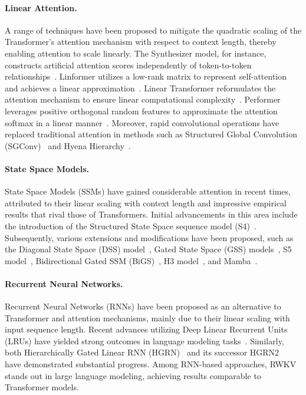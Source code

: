 \paragraph{Linear Attention.} A range of techniques have been proposed to mitigate the quadratic scaling of the Transformer's attention mechanism with respect to context length, thereby enabling attention to scale linearly. The Synthesizer model, for instance, constructs artificial attention scores independently of token-to-token relationships~\citep{Tay:20arxiv}. Linformer utilizes a low-rank matrix to represent self-attention and achieves a linear approximation~\citep{Wang:20arxiv}. Linear Transformer reformulates the attention mechanism to ensure linear computational complexity~\citep{Katharopoulos:20}. Performer leverages positive orthogonal random features to approximate the attention softmax in a linear manner~\citep{Choromanski:21}. Moreover, rapid convolutional operations have replaced traditional attention in methods such as Structured Global Convolution (SGConv)~\citep{Li:22} and Hyena Hierarchy~\citep{Poli:23}.

\paragraph{State Space Models.} State Space Models (SSMs) have gained considerable attention in recent times, attributed to their linear scaling with context length and impressive empirical results that rival those of Transformers. Initial advancements in this area include the introduction of the Structured State Space sequence model (S4)~\citep{Gu:21}. Subsequently, various extensions and modifications have been proposed, such as the Diagonal State Space (DSS) model~\citep{Gupta:22}, Gated State Space (GSS) models~\citep{Mehta:22}, S5 model~\citep{Smith:22}, Bidirectional Gated SSM (BiGS)~\citep{Wang:22}, H3 model~\citep{Fu:23}, and Mamba~\citep{Gu:24arxiv}.

\paragraph{Recurrent Neural Networks.} Recurrent Neural Networks (RNNs) have been proposed as an alternative to Transformer and attention mechanisms, mainly due to their linear scaling with input sequence length. Recent advances utilizing Deep Linear Recurrent Units (LRUs) have yielded strong outcomes in language modeling tasks~\citep{Orvieto:23, De:24arxiv}. Similarly, both Hierarchically Gated Linear RNN (HGRN)~\citep{Qin:23} and its successor HGRN2~\citep{Qin:24arxiv} have demonstrated substantial progress. Among RNN-based approaches, RWKV~\citep{Peng:23arxivshort,Peng:24arxivshort} stands out in large language modeling, achieving results comparable to Transformer models.

